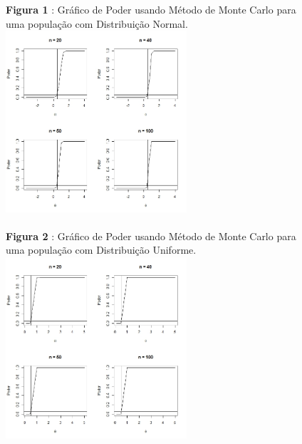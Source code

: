 \documentclass[a4paper,12pt]{article}
\begin{document}
\begin{figure}[H]
	\centering
	\textbf{Figura 1} : Gráfico de Poder usando Método de Monte Carlo para uma população com Distribuição Normal.
	\includegraphics[width=0.60\textwidth]{Normal.jpeg}\\~\\
	\textbf{Figura 2} : Gráfico de Poder usando Método de Monte Carlo para uma população com Distribuição Uniforme.
	\includegraphics[width=0.60\textwidth]{Uniforme.jpeg}\\~\\
	\label{Rotulo}
\end{figure}
\end{document}
